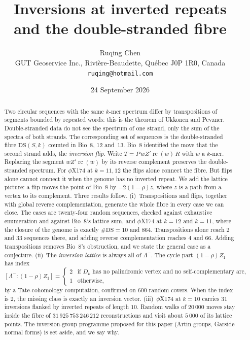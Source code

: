 \documentclass[11pt]{article}
\title{\bfseries Inversions at inverted repeats\\ and the double-stranded fibre}
\author{Ruqing Chen\\[2pt]
\normalsize GUT Geoservice Inc., Rivi\`ere-Beaudette, Qu\'ebec J0P 1R0, Canada\\
\normalsize\texttt{ruqing@hotmail.com}}
\date{24 September 2026}
\theoremstyle{plain}
\theoremstyle{definition}
\theoremstyle{remark}
\newcommand{\DS}{\mathrm{DS}}
\newcommand{\Lm}{\Lambda^{-}}
\newcommand{\rc}{\operatorname{rc}}
\begin{document}
\maketitle

\begin{abstract}
\noindent
Two circular sequences with the same $k$-mer spectrum differ by transpositions of segments bounded by
repeated words: this is the theorem of Ukkonen and Pevzner. Double-stranded data do not see the
spectrum of one strand, only the sum of the spectra of both strands. The corresponding set of sequences
is the double-stranded fibre $\DS(S,k)$ counted in Bio~8, 12 and~13. Bio~8 identified the move that
the second strand adds, the \emph{inversion flip}. Write $T=P\,wZ'\rc(w)\,R$ with $w$ a $k$-mer. Replacing
the segment $wZ'\rc(w)$ by its reverse complement preserves the double-stranded spectrum. For
$\phi$X174 at $k=11,12$ the flips alone connect the fibre. But flips alone cannot connect it when the
genome has no inverted repeat. We add the lattice picture: a flip moves the point of Bio~8 by
$-2(1-\rho)z$, where $z$ is a path from a vertex to its complement. Three results follow.
(i)~Transpositions and flips, together with global reverse complementation, generate the whole fibre
in every case we can close. The cases are twenty-four random sequences, checked against exhaustive
enumeration and against Bio~8's lattice sum, and $\phi$X174 at $k=12$ and $k=11$, where the closure of
the genome is exactly $\#\DS=10$ and $864$. Transpositions alone reach $2$ and $33$ sequences there,
and adding reverse complementation reaches $4$ and $66$. Adding transpositions removes Bio~8's
obstruction, and we state the general case as a conjecture.
(ii)~The \emph{inversion lattice} is always all of $\Lm$. The cycle part $(1-\rho)Z_1$ has index
\[
[\Lm:(1-\rho)Z_1]=\begin{cases}2&\text{if $D_k$ has no palindromic vertex and no self-complementary arc,}\\
1&\text{otherwise,}\end{cases}
\]
by a Tate-cohomology computation, confirmed on $600$ random covers. When the index is $2$, the missing
class is exactly an inversion vector.
(iii)~$\phi$X174 at $k=10$ carries $31$ inversions flanked by inverted repeats of length $10$. Random
walks of $20\,000$ moves stay inside the fibre of $31\,925\,753\,246\,212$ reconstructions and visit
about $5\,000$ of its lattice points. The inversion-group programme proposed for this paper (Artin
groups, Garside normal forms) is set aside, and we say why.
\end{abstract}
\end{document}
